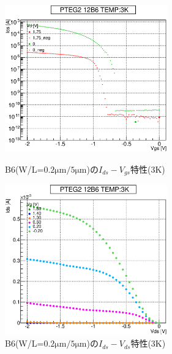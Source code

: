 				\begin{figure}[htbp]
					\begin{minipage}{0.5\hsize}
						\begin{center}
							\includegraphics[width=70mm]{./Chapter/Appendix/Picture/PBT/B6/PTEG2_12_B6_IdVg_3K.eps}
						\end{center}
						\caption{B6(W/L=$0.2\mathrm{\mu m}/5\mathrm{\mu m}$)の$I_{ds}-V_{gs}$特性(3K)}
						\label{fig:B6_IdVg_3K}
					\end{minipage}
					\begin{minipage}{0.5\hsize}
						\begin{center}
							\includegraphics[width=70mm]{./Chapter/Appendix/Picture/PBT/B6/PTEG2_12_B6_IdVd_3K.eps}
						\end{center}
						\caption{B6(W/L=$0.2\mathrm{\mu m}/5\mathrm{\mu m}$)の$I_{ds}-V_{ds}$特性(3K)}
						\label{fig:B6_IdVd_3K}
					\end{minipage}
				\end{figure}
